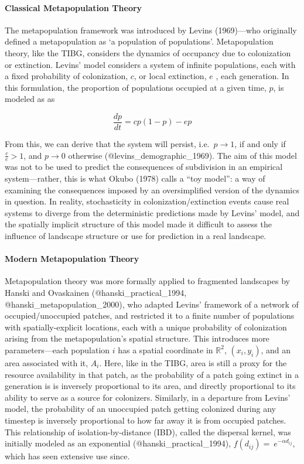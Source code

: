 \hypertarget{classical-metapopulation-theory}{%
\paragraph{Classical Metapopulation
Theory}\label{classical-metapopulation-theory}}

The metapopulation framework was introduced by Levins (1969)---who
originally defined a metapopulation as `a population of populations'.
Metapopulation theory, like the TIBG, considers the dynamics of
occupancy due to colonization or extinction. Levins' model considers a
system of infinite populations, each with a fixed probability of
colonization, \(c\), or local extinction, \(e\) , each generation. In
this formulation, the proportion of populations occupied at a given
time, \(p\), is modeled as as

\[\frac{dp}{dt} = cp(1-p)-ep\]

From this, we can derive that the system will persist, i.e.~\(p \to 1\),
if and only if \(\frac{c}{e} >1\), and \(p\to0\) otherwise
(@levins\_demographic\_1969). The aim of this model was not to be used
to predict the consequences of subdivision in an empirical
system---rather, this is what Okubo (1978) calls a ``toy model'': a way
of examining the consequences imposed by an oversimplified version of
the dynamics in question. In reality, stochasticity in
colonization/extinction events cause real systems to diverge from the
deterministic predictions made by Levins' model, and the spatially
implicit structure of this model made it difficult to assess the
influence of landscape structure or use for prediction in a real
landscape.

\hypertarget{modern-metapopulation-theory}{%
\paragraph{Modern Metapopulation
Theory}\label{modern-metapopulation-theory}}

Metapopulation theory was more formally applied to fragmented landscapes
by Hanski and Ovaskainen (@hanski\_practical\_1994,
@hanski\_metapopulation\_2000), who adapted Levins' framework of a
network of occupied/unoccupied patches, and restricted it to a finite
number of populations with spatially-explicit locations, each with a
unique probability of colonization arising from the metapopulation's
spatial structure. This introduces more parameters---each population
\(i\) has a spatial coordinate in \(\mathbb{R}^2\), \((x_i, y_i)\), and
an area associated with it, \(A_i\). Here, like in the TIBG, area is
still a proxy for the resource availability in that patch, as the
probability of a patch going extinct in a generation is is inversely
proportional to its area, and directly proportional to its ability to
serve as a source for colonizers. Similarly, in a departure from Levins'
model, the probability of an unoccupied patch getting colonized during
any timestep is inversely proportional to how far away it is from
occupied patches. This relationship of isolation-by-distance (IBD),
called the dispersal kernel, was initially modeled as an exponential
(@hanski\_practical\_1994), \(f(d_{ij})= \ e^{-\alpha d_{ij}}\), which
has seen extensive use since.

